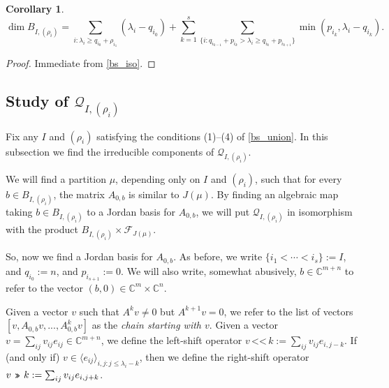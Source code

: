 \documentclass[12pt,psamsfonts]{article}
\newcommand{\leftshift}{\,\texttt{<<}\,}
\newcommand{\rightshift}{\mathbin{\rotatebox[origin=c]{180}{\leftshift}}}
\newtheorem{corollary}[theorem]{Corollary}
\begin{document}
\begin{corollary}\label{bs_dim}
    \[\dim B_{I, (\rho_i)} = \sum_{i : \lambda_i \geq q_{i_0} + \rho_{i_1}} (\lambda_i - q_{i_0}) + \sum_{k = 1}^s \sum_{\{i : q_{i_{k - 1}} + p_{i_k} > \lambda_i \geq q_{i_k} + p_{i_{k + 1}}\}} \min(p_{i_k}, \lambda_i - q_{i_k}).\]
\end{corollary}
\begin{proof}
    Immediate from \cref{bs_iso}.
\end{proof}

\subsection{Study of \texorpdfstring{\(\mathcal{Q}_{I, (\rho_i)}\)}{Q\_\{I, (p\_i)\}}}
Fix any \(I\) and \((\rho_i)\) satisfying the conditions (1)--(4) of \cref{bs_union}.
In this subsection we find the irreducible components of \(\mathcal{Q}_{I, (\rho_i)}\).
\par We will find a partition \(\mu\), depending only on \(I\) and \((\rho_i)\), such that for every \(b \in B_{I, (\rho_i)}\), the matrix \(A_{0,b}\) is similar to \(J(\mu)\).
By finding an algebraic map taking \(b \in B_{I, (\rho_i)}\) to a Jordan basis for \(A_{0,b}\), we will put \(\mathcal{Q}_{I, (\rho_i)}\) in isomorphism with the product \(B_{I, (\rho_i)} \times \mathcal{F}_{J(\mu)}\).
\par So, now we find a Jordan basis for \(A_{0, b}\).
As before, we write \(\{i_1 <  \cdots < i_s\} := I\), and \(q_{i_0} := n\), and \(p_{i_{s + 1}} := 0\).
We will also write, somewhat abusively, \(b \in \mathbb{C}^{m + n}\) to refer to the vector \((b, 0) \in \mathbb{C}^{m} \times \mathbb{C}^n\).
\par Given a vector \(v\) such that \(A^k v \neq 0\) but \(A^{k + 1} v = 0\), we refer to the list of vectors \([v, A_{0,b} v, ..., A_{0,b}^k v]\) as the \emph{chain starting with \(v\)}.
Given a vector \(v = \sum_{ij} v_{ij} e_{ij} \in \mathbb{C}^{m + n}\), we define the left-shift operator \(v \leftshift k := \sum_{ij} v_{ij} e_{i,j - k}\).
If (and only if) \(v \in \langle e_{ij} \rangle_{i,j: j \leq \lambda_i - k}\), then we define the right-shift operator \(v \rightshift k := \sum_{ij} v_{ij} e_{i,j + k}\).
\end{document}
